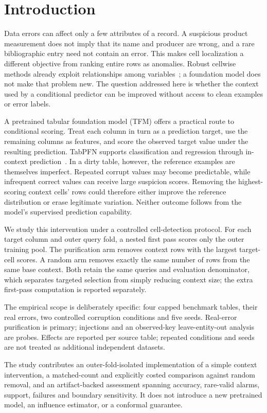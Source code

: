 \section{Introduction}
Data errors can affect only a few attributes of a record. A suspicious product measurement
does not imply that its name and producer are wrong, and a rare bibliographic entry need
not contain an error. This makes cell localization a different objective from ranking
entire rows as anomalies. Robust cellwise methods already exploit relationships among
variables~\cite{rousseeuw2018ddc}; a foundation model does not make that problem new.
The question addressed here is whether the context used by a conditional predictor can
be improved without access to clean examples or error labels.

A pretrained tabular foundation model (TFM) offers a practical route to conditional scoring. Treat each
column in turn as a prediction target, use the remaining columns as features, and score
the observed target value under the resulting prediction. TabPFN supports classification
and regression through in-context prediction~\cite{hollmann2025tabpfn}. In a dirty table,
however, the reference examples are themselves imperfect. Repeated corrupt values may
become predictable, while infrequent correct values can receive large suspicion scores.
Removing the highest-scoring context cells' rows could therefore either improve the
reference distribution or erase legitimate variation. Neither outcome follows from
the model's supervised prediction capability.

We study this intervention under a controlled cell-detection protocol. For each target
column and outer query fold, a nested first pass scores only the outer training pool.
The purification arm removes context rows with the largest target-cell scores. A random
arm removes exactly the same number of rows from the same base context. Both retain
the same queries and evaluation denominator, which separates targeted selection from
simply reducing context size; the extra first-pass computation is reported separately.

The empirical scope is deliberately specific: four capped benchmark tables, their
real errors, two controlled corruption conditions and five seeds. Real-error
purification is primary; injections and an observed-key leave-entity-out analysis
are probes. Effects are reported per source table; repeated conditions and seeds
are not treated as additional independent datasets.

The study contributes an outer-fold-isolated implementation of a simple context
intervention, a matched-count and explicitly costed comparison against random removal,
and an artifact-backed assessment spanning accuracy, rare-valid alarms, support,
failures and boundary sensitivity. It does not introduce a new pretrained model,
an influence estimator, or a conformal guarantee.
